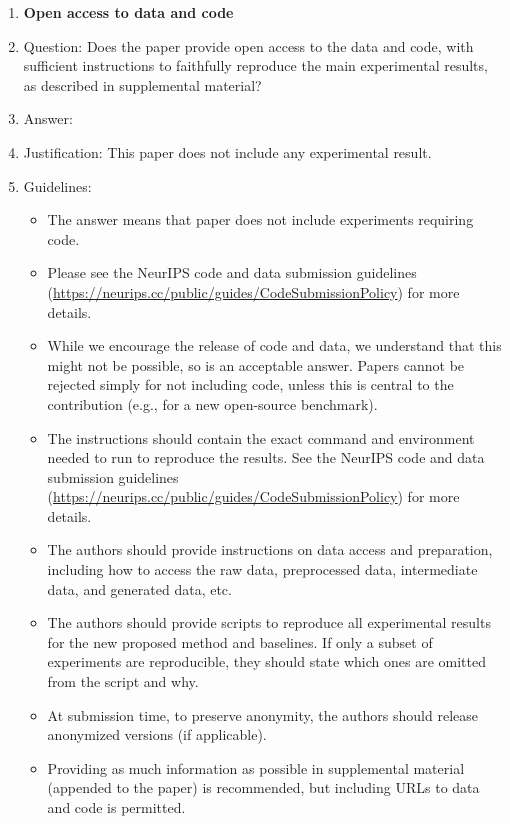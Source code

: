 \documentclass{article}
\theoremstyle{definition}
\theoremstyle{remark}
\begin{document}
\begin{enumerate}
\item {\bf Open access to data and code}
    \item[] Question: Does the paper provide open access to the data and code, with sufficient instructions to faithfully reproduce the main experimental results, as described in supplemental material?
    \item[] Answer: \answerNA{} %
    \item[] Justification: This paper does not include any experimental result.
    \item[] Guidelines:
    \begin{itemize}
        \item The answer \answerNA{} means that paper does not include experiments requiring code.
        \item Please see the NeurIPS code and data submission guidelines (\url{https://neurips.cc/public/guides/CodeSubmissionPolicy}) for more details.
        \item While we encourage the release of code and data, we understand that this might not be possible, so \answerNo{} is an acceptable answer. Papers cannot be rejected simply for not including code, unless this is central to the contribution (e.g., for a new open-source benchmark).
        \item The instructions should contain the exact command and environment needed to run to reproduce the results. See the NeurIPS code and data submission guidelines (\url{https://neurips.cc/public/guides/CodeSubmissionPolicy}) for more details.
        \item The authors should provide instructions on data access and preparation, including how to access the raw data, preprocessed data, intermediate data, and generated data, etc.
        \item The authors should provide scripts to reproduce all experimental results for the new proposed method and baselines. If only a subset of experiments are reproducible, they should state which ones are omitted from the script and why.
        \item At submission time, to preserve anonymity, the authors should release anonymized versions (if applicable).
        \item Providing as much information as possible in supplemental material (appended to the paper) is recommended, but including URLs to data and code is permitted.
    \end{itemize}



\end{enumerate}
\end{document}
